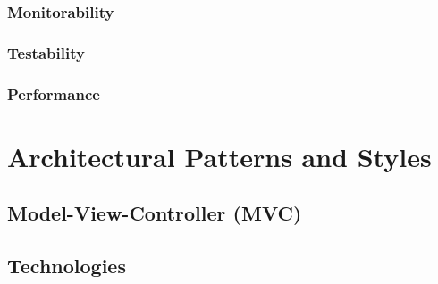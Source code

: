 \documentclass[a4paper,12pt,titlepage]{article}
\begin{document}
		\subsubsection{Monitorability}
			
			
		\subsubsection{Testability}
			
			
		\subsubsection{Performance}

\section{Architectural Patterns and Styles}
	\subsection{Model-View-Controller (MVC)}
	
	
	\subsection{Technologies}
	
	
	

\end{document}
